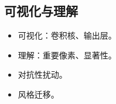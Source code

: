 \documentclass[
12pt, %
a4paper, 
oneside, %
headinclude,footinclude, %
]{scrartcl}
\begin{document}
\subsection[可视化与理解]{可视化与理解}
\begin{itemize}
\item 可视化：卷积核、输出层。
\item 理解：重要像素、显著性。
\item 对抗性扰动。
\item 风格迁移。
\end{itemize}
\end{document}
